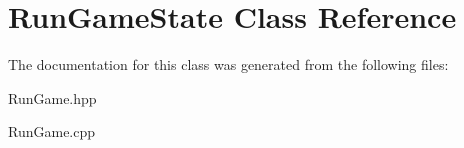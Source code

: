 \hypertarget{class_run_game_state}{}\section{Run\+Game\+State Class Reference}
\label{class_run_game_state}


The documentation for this class was generated from the following files\+:\begin{DoxyCompactItemize}
\item 
Run\+Game.\+hpp\item 
Run\+Game.\+cpp\end{DoxyCompactItemize}
